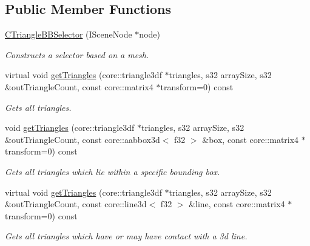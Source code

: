 \subsection*{Public Member Functions}
\begin{DoxyCompactItemize}
\item 
\hyperlink{classirr_1_1scene_1_1_c_triangle_b_b_selector_a0c9f4b197b16b8dcbff5ebc115c50b14}{C\-Triangle\-B\-B\-Selector} (I\-Scene\-Node $\ast$node)
\begin{DoxyCompactList}\small\item\em Constructs a selector based on a mesh. \end{DoxyCompactList}\item 
\hypertarget{classirr_1_1scene_1_1_c_triangle_b_b_selector_a97498e050f129d3b272a90fee16e26d7}{virtual void \hyperlink{classirr_1_1scene_1_1_c_triangle_b_b_selector_a97498e050f129d3b272a90fee16e26d7}{get\-Triangles} (core\-::triangle3df $\ast$triangles, s32 array\-Size, s32 \&out\-Triangle\-Count, const core\-::matrix4 $\ast$transform=0) const }\label{classirr_1_1scene_1_1_c_triangle_b_b_selector_a97498e050f129d3b272a90fee16e26d7}

\begin{DoxyCompactList}\small\item\em Gets all triangles. \end{DoxyCompactList}\item 
\hypertarget{classirr_1_1scene_1_1_c_triangle_b_b_selector_a5d4c51a26d43b7f20e6b8bcf36a28011}{void \hyperlink{classirr_1_1scene_1_1_c_triangle_b_b_selector_a5d4c51a26d43b7f20e6b8bcf36a28011}{get\-Triangles} (core\-::triangle3df $\ast$triangles, s32 array\-Size, s32 \&out\-Triangle\-Count, const core\-::aabbox3d$<$ f32 $>$ \&box, const core\-::matrix4 $\ast$transform=0) const }\label{classirr_1_1scene_1_1_c_triangle_b_b_selector_a5d4c51a26d43b7f20e6b8bcf36a28011}

\begin{DoxyCompactList}\small\item\em Gets all triangles which lie within a specific bounding box. \end{DoxyCompactList}\item 
\hypertarget{classirr_1_1scene_1_1_c_triangle_b_b_selector_a3f399b825d31a0ffbfc5681394281353}{virtual void \hyperlink{classirr_1_1scene_1_1_c_triangle_b_b_selector_a3f399b825d31a0ffbfc5681394281353}{get\-Triangles} (core\-::triangle3df $\ast$triangles, s32 array\-Size, s32 \&out\-Triangle\-Count, const core\-::line3d$<$ f32 $>$ \&line, const core\-::matrix4 $\ast$transform=0) const }\label{classirr_1_1scene_1_1_c_triangle_b_b_selector_a3f399b825d31a0ffbfc5681394281353}

\begin{DoxyCompactList}\small\item\em Gets all triangles which have or may have contact with a 3d line. \end{DoxyCompactList}\end{DoxyCompactItemize}
